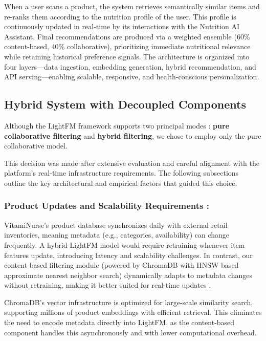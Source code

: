 \par When a user scans a product, the system retrieves semantically similar items and re-ranks them according to the nutrition profile of the user.
This profile is continuously updated in real-time by its interactions with
the Nutrition AI Assistant.
Final recommendations are produced via a weighted ensemble (60\% content-based, 40\% collaborative), prioritizing immediate nutritional
relevance while retaining historical preference signals. The architecture is
organized into four layers—data ingestion, embedding generation, hybrid
recommendation, and API serving—enabling scalable, responsive, and health-conscious personalization.


\subsection{Hybrid System with Decoupled Components}

Although the LightFM framework supports two principal modes : \textbf{pure collaborative filtering} and \textbf{hybrid filtering}, we chose to employ only the pure collaborative model.

This decision was made after extensive evaluation and careful alignment with the platform’s real-time infrastructure requirements. The following subsections outline the key architectural and empirical factors that guided this choice.



\subsubsection{Product Updates and Scalability Requirements :}
VitamiNurse's product database synchronizes daily with external retail inventories, meaning metadata (e.g., categories, availability) can change frequently. A hybrid LightFM model would require retraining whenever item features update, introducing latency and scalability challenges. In contrast, our content-based filtering module (powered by ChromaDB with HNSW-based approximate nearest neighbor search) dynamically adapts to metadata changes without retraining, making it better suited for real-time updates \cite{chromadb}.

ChromaDB's vector infrastructure is optimized for large-scale similarity search, supporting millions of product embeddings with efficient retrieval. This eliminates the need to encode metadata directly into LightFM, as the content-based component handles this asynchronously and with lower computational overhead.

